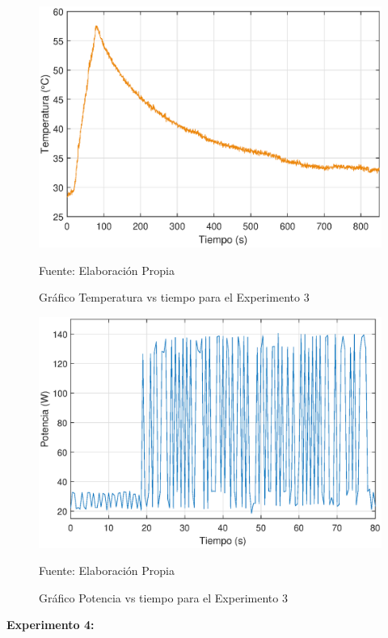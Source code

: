 \begin{figure}[H]
\centering
\includegraphics[scale=0.65]{Figuras/Exp4_T.eps}
\caption{Gráfico Temperatura vs tiempo para el Experimento 3}
Fuente: Elaboración Propia
\label{exp4_T}
\end{figure}

\begin{figure}[H]
\centering
\includegraphics[scale=0.66]{Figuras/Exp4_P.eps}
\caption{Gráfico Potencia vs tiempo para el Experimento 3}
Fuente: Elaboración Propia
\label{exp4_P}
\end{figure}

\textbf{Experimento 4:}

